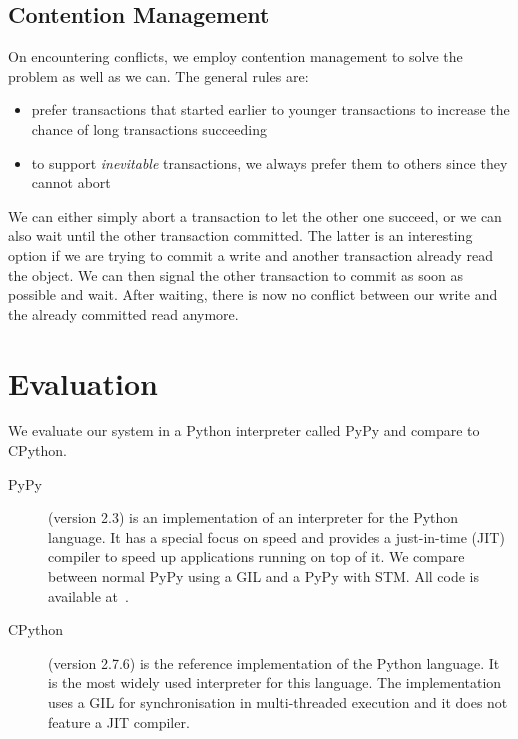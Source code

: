 \documentclass{sigplanconf}
\begin{document}
\subsection{Contention Management\label{subsub:contentionmanagement}}

On encountering conflicts, we employ contention management to solve
the problem as well as we can. The general rules are:

\begin{itemize}
\item prefer transactions that started earlier to younger transactions
  to increase the chance of long transactions succeeding
\item to support \emph{inevitable} transactions, we always prefer them
  to others since they cannot abort~\cite{blundell06}
\end{itemize}

We can either simply abort a transaction to let the other one succeed,
or we can also wait until the other transaction committed. The latter
is an interesting option if we are trying to commit a write and
another transaction already read the object. We can then signal the
other transaction to commit as soon as possible and wait. After
waiting, there is now no conflict between our write and the already
committed read anymore.


\vspace{1cm} %

\section{Evaluation}

We evaluate our system in a Python interpreter called
PyPy and compare to CPython.
\begin{description}
\item[PyPy] (version 2.3) is an implementation of an
  interpreter for the Python language. It has a special focus on speed
  and provides a just-in-time (JIT) compiler to speed up applications
  running on top of it. We compare between normal PyPy
  using a GIL and a PyPy with STM. All code is available at~\cite{pypy}.
\item[CPython] (version 2.7.6) is the reference implementation of the Python
  language. It is the most widely used interpreter for this language.
  The implementation uses a GIL for synchronisation in multi-threaded
  execution and it does not feature a JIT compiler.
\end{description}
\end{document}
